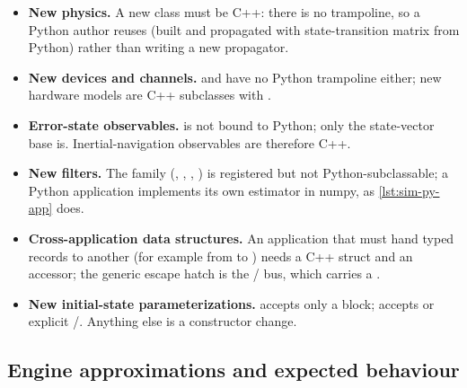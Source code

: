 \begin{itemize}[leftmargin=*]
  \item \textbf{New physics.} A new  class must be C++: there is no
     trampoline, so a Python author reuses
     (built and propagated with state-transition matrix from
    Python) rather than writing a new propagator.
  \item \textbf{New devices and channels.}  and  have no
    Python trampoline either; new hardware models are C++ subclasses with
    .
  \item \textbf{Error-state observables.}  is not bound
    to Python; only the state-vector  base is. Inertial-navigation
    observables are therefore C++.
  \item \textbf{New filters.} The  family (, ,
    , ) is registered but not
    Python-subclassable; a Python application implements its own estimator in
    numpy, as \cref{lst:sim-py-app} does.
  \item \textbf{Cross-application data structures.} An application that must hand
    typed records to another (for example  from
     to ) needs a C++ struct and an
    accessor; the generic escape hatch is the  /  bus,
    which carries a .
  \item \textbf{New initial-state parameterizations.}  accepts only
    a  block;  accepts  or
    explicit /. Anything else is a constructor change.
\end{itemize}

\subsection{Engine approximations and expected behaviour}

